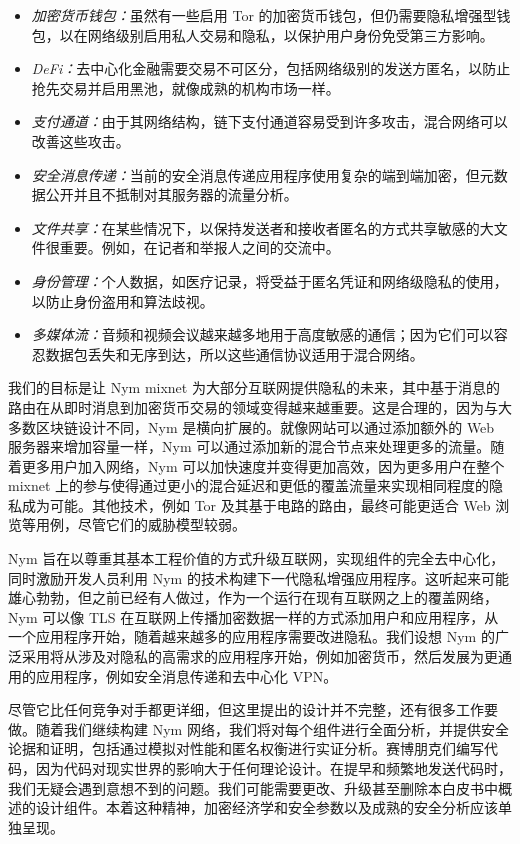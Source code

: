 \documentclass{article}
\begin{document}
\begin{itemize}
\item \emph{加密货币钱包：}虽然有一些启用 Tor 的加密货币钱包，但仍需要隐私增强型钱包，以在网络级别启用私人交易和隐私，以保护用户身份免受第三方影响。
\item \emph{DeFi：}去中心化金融需要交易不可区分，包括网络级别的发送方匿名，以防止抢先交易并启用黑池，就像成熟的机构市场一样。
\item \emph{支付通道：}由于其网络结构，链下支付通道容易受到许多攻击，混合网络可以改善这些攻击\cite{ref64}。
\item \emph{安全消息传递：}当前的安全消息传递应用程序使用复杂的端到端加密，但元数据公开并且不抵制对其服务器的流量分析。
\item \emph{文件共享：}在某些情况下，以保持发送者和接收者匿名的方式共享敏感的大文件很重要。例如，在记者和举报人之间的交流中。
\item \emph{身份管理：}个人数据，如医疗记录，将受益于匿名凭证和网络级隐私的使用，以防止身份盗用和算法歧视。
\item \emph{多媒体流：}音频和视频会议越来越多地用于高度敏感的通信；因为它们可以容忍数据包丢失和无序到达，所以这些通信协议适用于混合网络\cite{ref27}。
\end{itemize}

	我们的目标是让 Nym mixnet 为大部分互联网提供隐私的未来，其中基于消息的路由在从即时消息到加密货币交易的领域变得越来越重要。这是合理的，因为与大多数区块链设计不同，Nym 是横向扩展的。就像网站可以通过添加额外的 Web 服务器来增加容量一样，Nym 可以通过添加新的混合节点来处理更多的流量。随着更多用户加入网络，Nym 可以加快速度并变得更加高效，因为更多用户在整个 mixnet 上的参与使得通过更小的混合延迟和更低的覆盖流量来实现相同程度的隐私成为可能。其他技术，例如 Tor 及其基于电路的路由，最终可能更适合 Web 浏览等用例，尽管它们的威胁模型较弱。\newline

	Nym 旨在以尊重其基本工程价值的方式升级互联网，实现组件的完全去中心化，同时激励开发人员利用 Nym 的技术构建下一代隐私增强应用程序。这听起来可能雄心勃勃，但之前已经有人做过，作为一个运行在现有互联网之上的覆盖网络，Nym 可以像 TLS 在互联网上传播加密数据一样的方式添加用户和应用程序，从一个应用程序开始，随着越来越多的应用程序需要改进隐私。我们设想 Nym 的广泛采用将从涉及对隐私的高需求的应用程序开始，例如加密货币，然后发展为更通用的应用程序，例如安全消息传递和去中心化 VPN。\newline

	尽管它比任何竞争对手都更详细，但这里提出的设计并不完整，还有很多工作要做。随着我们继续构建 Nym 网络，我们将对每个组件进行全面分析，并提供安全论据和证明，包括通过模拟对性能和匿名权衡进行实证分析。赛博朋克们编写代码，因为代码对现实世界的影响大于任何理论设计\cite{ref57}。在提早和频繁地发送代码时，我们无疑会遇到意想不到的问题。我们可能需要更改、升级甚至删除本白皮书中概述的设计组件。本着这种精神，加密经济学和安全参数以及成熟的安全分析应该单独呈现。\newline
\end{document}
